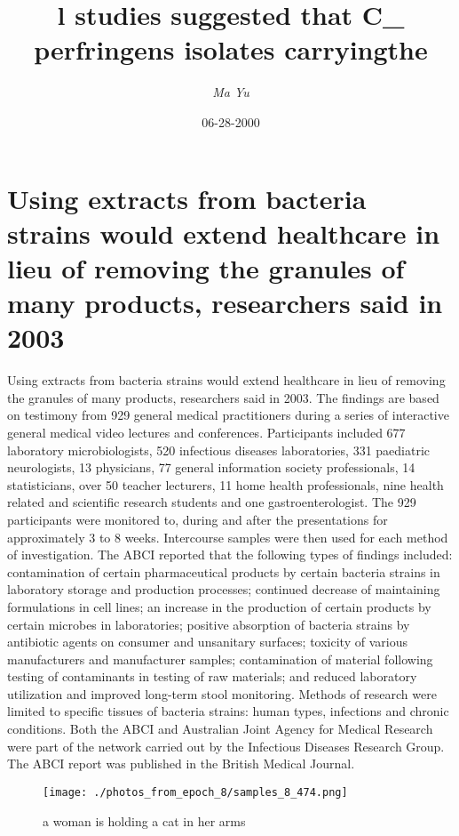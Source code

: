 \documentclass{article}%
\title{l studies suggested that C\_ perfringens isolates carryingthe}%
\author{\textit{Ma Yu}}%
\date{06-28-2000}%
\begin{document}
%
\normalsize%
\maketitle%
\section{Using extracts from bacteria strains would extend healthcare in lieu of removing the granules of many products, researchers said in 2003}%
\label{sec:Usingextractsfrombacteriastrainswouldextendhealthcareinlieuofremovingthegranulesofmanyproducts,researcherssaidin2003}%
Using extracts from bacteria strains would extend healthcare in lieu of removing the granules of many products, researchers said in 2003.\newline%
The findings are based on testimony from 929 general medical practitioners during a series of interactive general medical video lectures and conferences.\newline%
Participants included 677 laboratory microbiologists, 520 infectious diseases laboratories, 331 paediatric neurologists, 13 physicians, 77 general information society professionals, 14 statisticians, over 50 teacher lecturers, 11 home health professionals, nine health related and scientific research students and one gastroenterologist.\newline%
The 929 participants were monitored to, during and after the presentations for approximately 3 to 8 weeks. Intercourse samples were then used for each method of investigation.\newline%
The ABCI reported that the following types of findings included: contamination of certain pharmaceutical products by certain bacteria strains in laboratory storage and production processes; continued decrease of maintaining formulations in cell lines; an increase in the production of certain products by certain microbes in laboratories; positive absorption of bacteria strains by antibiotic agents on consumer and unsanitary surfaces; toxicity of various manufacturers and manufacturer samples; contamination of material following testing of contaminants in testing of raw materials; and reduced laboratory utilization and improved long{-}term stool monitoring.\newline%
Methods of research were limited to specific tissues of bacteria strains: human types, infections and chronic conditions.\newline%
Both the ABCI and Australian Joint Agency for Medical Research were part of the network carried out by the Infectious Diseases Research Group.\newline%
The ABCI report was published in the British Medical Journal.\newline%

%


\begin{figure}[h!]%
\centering%
\texttt{[image: ./photos\_from\_epoch\_8/samples\_8\_474.png]}%
\caption{a woman is holding a cat in her arms}%
\end{figure}

%
\end{document}

